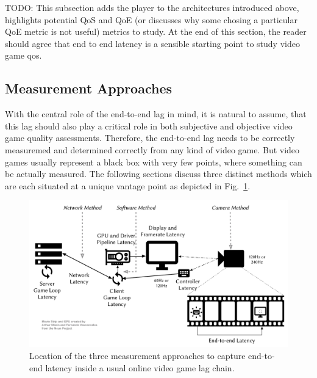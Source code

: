 TODO:
This subsection adds the player to the architectures introduced above, highlights potential QoS and QoE (or discusses why some chosing a particular QoE metric is not useful) metrics to study. At the end of this section, the reader should agree that end to end latency is a sensible starting point to study video game qos.


\subsection{Measurement Approaches}
\label{sec:measurementapproaches}

With the central role of the end-to-end lag in mind, it is natural to assume, that this lag should also play a critical role in both subjective and objective video game quality assessments. Therefore, the end-to-end lag needs to be correctly measuremed and determined correctly from any kind of video game. But video games usually represent a black box with very few points, where something can be actually measured. The following sections discuss three distinct methods which are each situated at a unique vantage point as depicted in Fig.~\ref{fig:measurement-methods}.

\begin{figure}[!t]
    \centering
    \includegraphics[width=1.0\columnwidth]{../models/e2e-lag.pdf}
    \caption{Location of the three measurement approaches to capture end-to-end latency inside a usual online video game lag chain.}
\label{fig:measurement-methods}
\end{figure}

